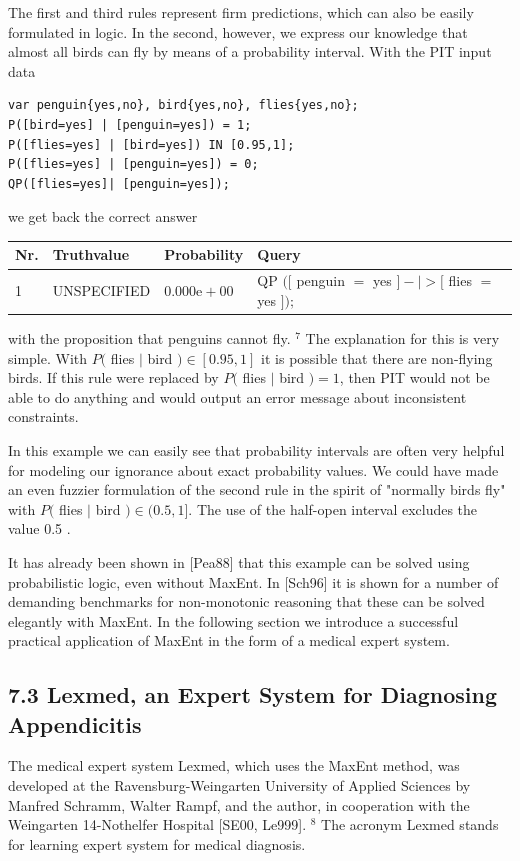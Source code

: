 \documentclass[10pt]{book}
\begin{document}
\begin{center}
\begin{enumerate}
The first and third rules represent firm predictions, which can also be easily formulated in logic. In the second, however, we express our knowledge that almost all birds can fly by means of a probability interval. With the PIT input data

\begin{verbatim}
var penguin{yes,no}, bird{yes,no}, flies{yes,no};
P([bird=yes] | [penguin=yes]) = 1;
P([flies=yes] | [bird=yes]) IN [0.95,1];
P([flies=yes] | [penguin=yes]) = 0;
QP([flies=yes]| [penguin=yes]);
\end{verbatim}

we get back the correct answer

\begin{center}
\begin{tabular}{llll}
\hline
Nr. & Truthvalue & Probability & Query \\
\hline
1 & UNSPECIFIED & $0.000 \mathrm{e}+00$ & QP $([$ penguin $=$ yes $]-\mid>[$ flies $=$ yes $]) ;$ \\
\hline
\end{tabular}
\end{center}

with the proposition that penguins cannot fly. ${ }^{7}$ The explanation for this is very simple. With $P($ flies $\mid$ bird $) \in[0.95,1]$ it is possible that there are non-flying birds. If this rule were replaced by $P($ flies $\mid$ bird $)=1$, then PIT would not be able to do anything and would output an error message about inconsistent constraints.

In this example we can easily see that probability intervals are often very helpful for modeling our ignorance about exact probability values. We could have made an even fuzzier formulation of the second rule in the spirit of "normally birds fly" with $P($ flies $\mid$ bird $) \in(0.5,1]$. The use of the half-open interval excludes the value 0.5 .

It has already been shown in [Pea88] that this example can be solved using probabilistic logic, even without MaxEnt. In [Sch96] it is shown for a number of demanding benchmarks for non-monotonic reasoning that these can be solved elegantly with MaxEnt. In the following section we introduce a successful practical application of MaxEnt in the form of a medical expert system.

\subsection*{7.3 Lexmed, an Expert System for Diagnosing Appendicitis}
The medical expert system Lexmed, which uses the MaxEnt method, was developed at the Ravensburg-Weingarten University of Applied Sciences by Manfred Schramm, Walter Rampf, and the author, in cooperation with the Weingarten 14-Nothelfer Hospital [SE00, Le999]. ${ }^{8}$ The acronym Lexmed stands for learning expert system for medical diagnosis.


\end{enumerate}
\end{center}
\end{document}
